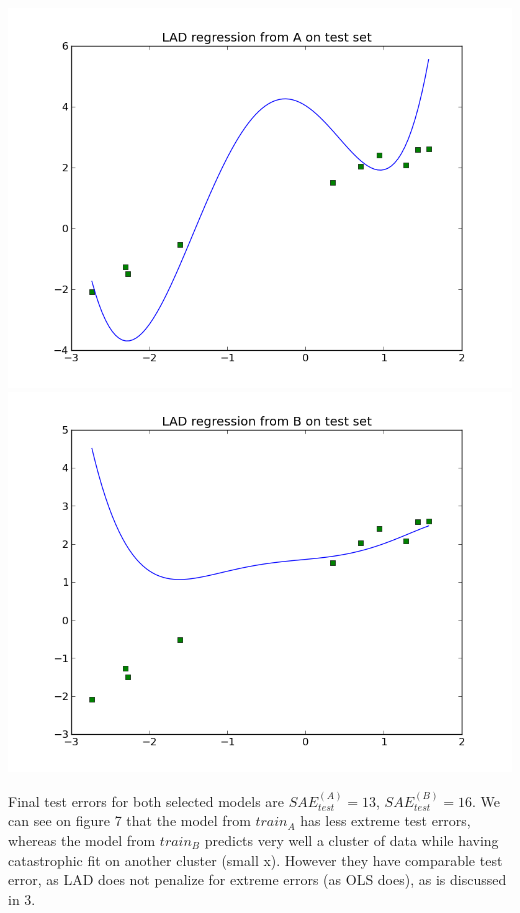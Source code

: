\documentclass[twoside]{article}
\begin{document}
\begingroup
\centering
\includegraphics[scale=0.17]{./img/LAD_test_A.png}
\includegraphics[scale=0.17]{./img/LAD_B_test.png}
\endgroup

Final test errors for both selected models are $SAE_{test}^{(A)} = 13$, $SAE_{test}^{(B)} = 16$. We can see on figure 7 that the model from $train_A$ has less extreme test errors, whereas the model from $train_B$ predicts very well a cluster of data while having catastrophic fit on another cluster (small x). However they have comparable test error, as LAD does not penalize for extreme errors (as OLS does), as is discussed in 3.
\end{document}
